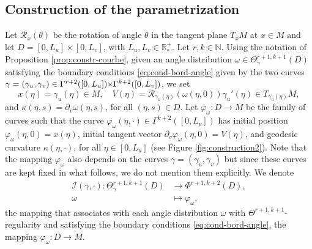 \documentclass{article}
\newcommand{\I}{\mathcal{I}}
\newcommand{\RR}{\mathcal{R}}
\newcommand{\PLH}{{\mkern-1mu\times\mkern-1mu}}
\newcommand{\Times}{\PLH}
\newcommand{\R}{\mathbb{R}}
\newcommand{\surf}{M}
\newcommand{\EN}{\mathbb{N}}
\newcommand{\ko}{\kappa}
\theoremstyle{remark}
\theoremstyle{prpart}
\begin{document}
\subsection{Construction of the parametrization}\label{subsubsec:constr-param}

Let $\RR_x(\theta)$ be the rotation of angle $\theta$ in the tangent plane $T_x\surf$ at $x\in \surf$ and let $D=[0,L_u]\times[0,L_v]$, with $L_u,L_v\in\R^+_\ast$. Let $r,k\in\EN$. Using the notation of Proposition \ref{prop:constr-courbe}, given an angle distribution $\omega\in\Theta^{r+1,k+1}_{\gamma}(D)$ satisfying the boundary conditions \eqref{eq:cond-bord-angle} given by the two curves $\gamma=(\gamma_u,\gamma_v)\in\Gamma^{r+2}([0,L_u])\Times \Gamma^{k+2}([0,L_v])$, we set 
\begin{equation}\label{eq:constr-cheb}
  x(\eta)=\gamma_u(\eta)\in\surf,\quad V(\eta) = \RR_{\gamma_u(\eta)}(\omega(\eta,0))\gamma_u'(\eta)\in T_{\gamma_u(\eta)}\surf,
\end{equation}
and $\ko(\eta,s) = \partial_v\omega(\eta,s)$, for all $(\eta,s)\in D$. Let $\varphi_\omega:D\to\surf$ be the family of curves such that the curve $\varphi_\omega(\eta,\cdot)\in\Gamma^{k+2}([0,L_v])$ has initial position $\varphi_\omega(\eta,0) = x(\eta)$, initial tangent vector $\partial_v\varphi_\omega(\eta,0) = V(\eta)$, and geodesic curvature $\ko(\eta,\cdot)$, for all $\eta\in[0,L_u]$ (see Figure \ref{fig:construction2}). Note that the mapping $\varphi_\omega$ also depends on the curves $\gamma=(\gamma_u,\gamma_v)$ but since these curves are kept fixed in what follows, we do not mention them explicitly. We denote
\begin{equation*}%
  \begin{split}
    \I(\gamma,\cdot) : \Theta^{r+1,k+1}_\gamma(D) & \to \Phi^{r+1,k+2}(D), \\
     \omega & \mapsto \varphi_\omega,
\end{split}
\end{equation*}
the mapping that associates with each angle distribution $\omega$ with $\Theta^{r+1,k+1}$-regularity and satisfying the boundary conditions \eqref{eq:cond-bord-angle}, the mapping $\varphi_\omega : D \to \surf$.
\end{document}
